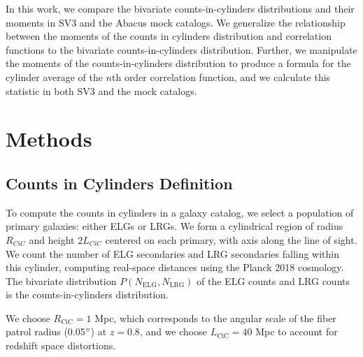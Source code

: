 \documentclass[fleqn,usenatbib]{mnras}
\begin{document}
In this work, we compare the bivariate counts-in-cylinders distributions and their moments in SV3 and the Abacus mock catalogs. We generalize the relationship between the moments of the counts in cylinders distribution and correlation functions to the bivariate counts-in-cylinders distribution. Further, we manipulate the moments of the counts-in-cylinders distribution to produce a formula for the cylinder average of the $n$th order correlation function, and we calculate this statistic in both SV3 and the mock catalogs.


\section*{Methods}
\subsection*{Counts in Cylinders Definition}
To compute the counts in cylinders in a galaxy catalog, we select a population of primary galaxies: either ELGs or LRGs. We form a cylindrical region of radius $R_{CiC}$ and height $2L_{CiC}$ centered on each primary, with axis along the line of sight. We count the number of ELG secondaries and LRG secondaries falling within this cylinder, computing real-space distances using the Planck 2018 cosmology. The bivariate distribution $P(N_{\text{ELG}},N_{\text{LRG}})$ of the ELG counts and LRG counts is the counts-in-cylinders distribution.

We choose $R_{\text{CiC}} = 1$ Mpc, which corresponds to the angular scale of the fiber patrol radius (0.05$\degree$) at $z = 0.8$, and we choose $L_{\text{CiC}} = 40$ Mpc to account for redshift space distortions.
\end{document}
